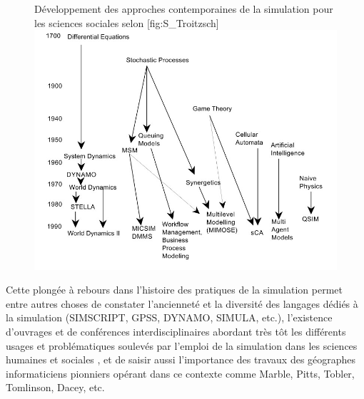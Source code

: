 \begin{figure}[h]
\begin{sidecaption}{ Développement des approches contemporaines de la simulation pour les sciences sociales selon \textcite{Troitzsch1997}}[fig:S_Troitzsch]
 \centering
 \includegraphics[width=.9\linewidth]{lineaire_figure.jpg}
  \end{sidecaption}
\end{figure}

Cette plongée à rebours dans l'histoire des pratiques de la simulation permet entre autres choses de constater l'ancienneté et la diversité des langages dédiés à la simulation (SIMSCRIPT, GPSS, DYNAMO, SIMULA, etc.), l'existence d'ouvrages et de conférences interdisciplinaires abordant très tôt les différents usages et problématiques soulevés par l'emploi de la simulation dans les sciences humaines et sociales \autocites{Shubik1960b,Shubik1960a, Borko1962, Guetzkow1962, Beshers1965, Guetzkow1972, Shubik1972, Morgan2004, Dutton1971}⁠⁠, et de saisir aussi l'importance des travaux des géographes informaticiens pionniers opérant dans ce contexte comme Marble, Pitts, Tobler, Tomlinson, Dacey, etc. \autocites{Marble2010, Marble1972}

